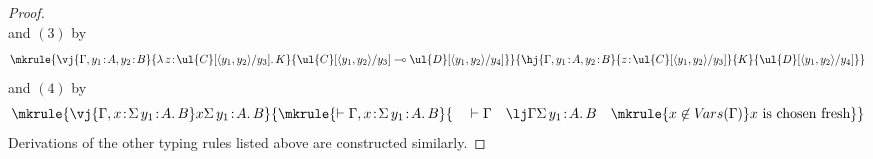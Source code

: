 \begin{proof}
\[{{{}
}
}
\]
and $(3)$ by
\[
\mkrule
{\vj {\Gamma, y_1 \!:\! A , y_2 \!:\! B} {\lambda\, z \!:\! \ul{C}[\langle y_1 , y_2 \rangle/y_3] .\, K} {\ul{C}[\langle y_1 , y_2 \rangle/y_3] \multimap \ul{D}[\langle y_1 , y_2 \rangle/y_4]}}
{\hj {\Gamma, y_1 \!:\! A, y_2 \!:\! B} {z \!:\! \ul{C}[\langle y_1 , y_2 \rangle /y_3]} {K} {\ul{D}[\langle y_1 , y_2 \rangle /y_4]}}
\]
and $(4)$ by
\[
\mkrule
{\vj {\Gamma, x \!:\! \Sigma\, y_1 \!:\! A .\, B} x {\Sigma\, y_1 \!:\! A .\, B}}
{
\mkrule
{\vdash {\Gamma, x \!:\! \Sigma\, y_1 \!:\! A .\, B}}
{
\hspace{0.45cm}
\vdash \Gamma
\quad
\lj \Gamma {\Sigma\, y_1 \!:\! A .\, B
\quad
\mkrule
{x \not\in V\!ars(\Gamma)}}
{x \text{~is chosen fresh}}
}
}
\]
Derivations of the other typing rules listed above are constructed similarly.
\end{proof}


